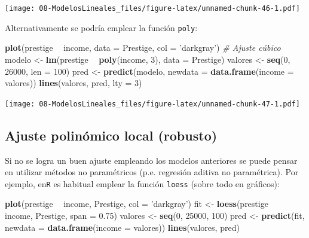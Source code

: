 \documentclass[]{book}
\newenvironment{Shaded}{\begin{snugshade}}{\end{snugshade}}
\newcommand{\CommentTok}[1]{\textcolor[rgb]{0.56,0.35,0.01}{\textit{#1}}}
\newcommand{\DataTypeTok}[1]{\textcolor[rgb]{0.13,0.29,0.53}{#1}}
\newcommand{\DecValTok}[1]{\textcolor[rgb]{0.00,0.00,0.81}{#1}}
\newcommand{\FloatTok}[1]{\textcolor[rgb]{0.00,0.00,0.81}{#1}}
\newcommand{\KeywordTok}[1]{\textcolor[rgb]{0.13,0.29,0.53}{\textbf{#1}}}
\newcommand{\NormalTok}[1]{#1}
\newcommand{\OperatorTok}[1]{\textcolor[rgb]{0.81,0.36,0.00}{\textbf{#1}}}
\newcommand{\StringTok}[1]{\textcolor[rgb]{0.31,0.60,0.02}{#1}}
\begin{document}
\texttt{[image: 08-ModelosLineales\_files/figure-latex/unnamed-chunk-46-1.pdf]}

Alternativamente se podría emplear la función \texttt{poly}:

\begin{Shaded}
\begin{Highlighting}[]
\KeywordTok{plot}\NormalTok{(prestige }\OperatorTok{~}\StringTok{ }\NormalTok{income, }\DataTypeTok{data =}\NormalTok{ Prestige, }\DataTypeTok{col =} \StringTok{'darkgray'}\NormalTok{)}
\CommentTok{# Ajuste cúbico}
\NormalTok{modelo <-}\StringTok{ }\KeywordTok{lm}\NormalTok{(prestige }\OperatorTok{~}\StringTok{ }\KeywordTok{poly}\NormalTok{(income, }\DecValTok{3}\NormalTok{), }\DataTypeTok{data =}\NormalTok{ Prestige)}
\NormalTok{valores <-}\StringTok{ }\KeywordTok{seq}\NormalTok{(}\DecValTok{0}\NormalTok{, }\DecValTok{26000}\NormalTok{, }\DataTypeTok{len =} \DecValTok{100}\NormalTok{)}
\NormalTok{pred <-}\StringTok{ }\KeywordTok{predict}\NormalTok{(modelo, }\DataTypeTok{newdata =} \KeywordTok{data.frame}\NormalTok{(}\DataTypeTok{income =}\NormalTok{ valores))}
\KeywordTok{lines}\NormalTok{(valores, pred, }\DataTypeTok{lty =} \DecValTok{3}\NormalTok{) }
\end{Highlighting}
\end{Shaded}

\texttt{[image: 08-ModelosLineales\_files/figure-latex/unnamed-chunk-47-1.pdf]}

\hypertarget{ajuste-polinomico-local-robusto}{%
\subsection{Ajuste polinómico local (robusto)}\label{ajuste-polinomico-local-robusto}}

Si no se logra un buen ajuste empleando los modelos anteriores se puede pensar en
utilizar métodos no paramétricos (p.e. regresión aditiva no paramétrica). Por ejemplo,
en\texttt{R} es habitual emplear la función \texttt{loess} (sobre todo en gráficos):

\begin{Shaded}
\begin{Highlighting}[]
\KeywordTok{plot}\NormalTok{(prestige }\OperatorTok{~}\StringTok{ }\NormalTok{income, Prestige, }\DataTypeTok{col =} \StringTok{'darkgray'}\NormalTok{)}
\NormalTok{fit <-}\StringTok{ }\KeywordTok{loess}\NormalTok{(prestige }\OperatorTok{~}\StringTok{ }\NormalTok{income, Prestige, }\DataTypeTok{span =} \FloatTok{0.75}\NormalTok{)}
\NormalTok{valores <-}\StringTok{ }\KeywordTok{seq}\NormalTok{(}\DecValTok{0}\NormalTok{, }\DecValTok{25000}\NormalTok{, }\DecValTok{100}\NormalTok{)}
\NormalTok{pred <-}\StringTok{ }\KeywordTok{predict}\NormalTok{(fit, }\DataTypeTok{newdata =} \KeywordTok{data.frame}\NormalTok{(}\DataTypeTok{income =}\NormalTok{ valores))}
\KeywordTok{lines}\NormalTok{(valores, pred)}
\end{Highlighting}
\end{Shaded}
\end{document}
